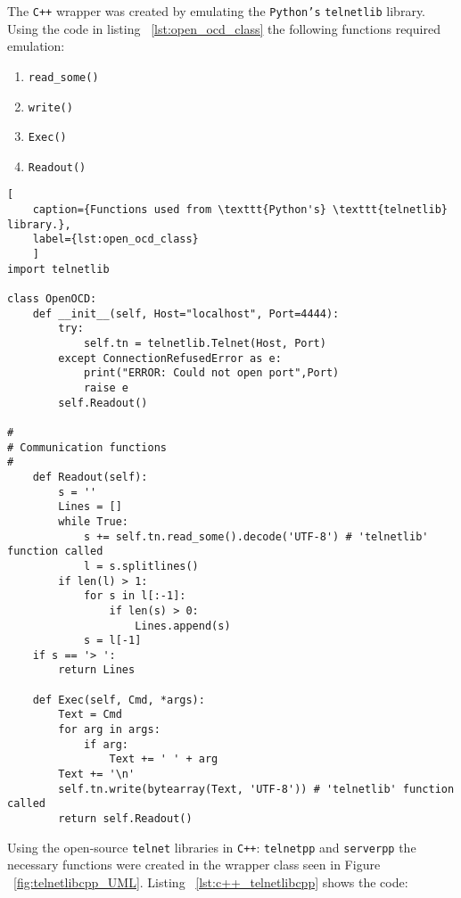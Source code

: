 The \texttt{C++} wrapper was created by emulating the \texttt{Python's} \texttt{telnetlib} library. Using the code in listing ~\ref{lst:open_ocd_class} the following functions required emulation:

\begin{enumerate}
	\item \texttt{read\_some()}
	\item \texttt{write()}
	\item \texttt{Exec()}
	\item \texttt{Readout()}
\end{enumerate}


\begin{lstlisting}[
	caption={Functions used from \texttt{Python's} \texttt{telnetlib} library.},
	label={lst:open_ocd_class}
	]
import telnetlib

class OpenOCD:
	def __init__(self, Host="localhost", Port=4444):
		try:
			self.tn = telnetlib.Telnet(Host, Port)
		except ConnectionRefusedError as e:
			print("ERROR: Could not open port",Port)
			raise e
		self.Readout()

#
# Communication functions
#
	def Readout(self):
		s = ''
		Lines = []
		while True:
			s += self.tn.read_some().decode('UTF-8') # 'telnetlib' function called
			l = s.splitlines()
		if len(l) > 1:
			for s in l[:-1]:
				if len(s) > 0:
					Lines.append(s)
			s = l[-1]
	if s == '> ':
		return Lines

	def Exec(self, Cmd, *args):
		Text = Cmd
		for arg in args:
			if arg:
				Text += ' ' + arg
		Text += '\n'
		self.tn.write(bytearray(Text, 'UTF-8')) # 'telnetlib' function called
		return self.Readout()
\end{lstlisting}

Using the open-source \texttt{telnet} libraries in \texttt{C++}: \texttt{telnetpp}\cite{telnetpp_library} and \texttt{serverpp}\cite{serverpp_library} the necessary functions were created in the wrapper class seen in Figure ~\ref{fig:telnetlibcpp_UML}. Listing ~\ref{lst:c++_telnetlibcpp} shows the code:

